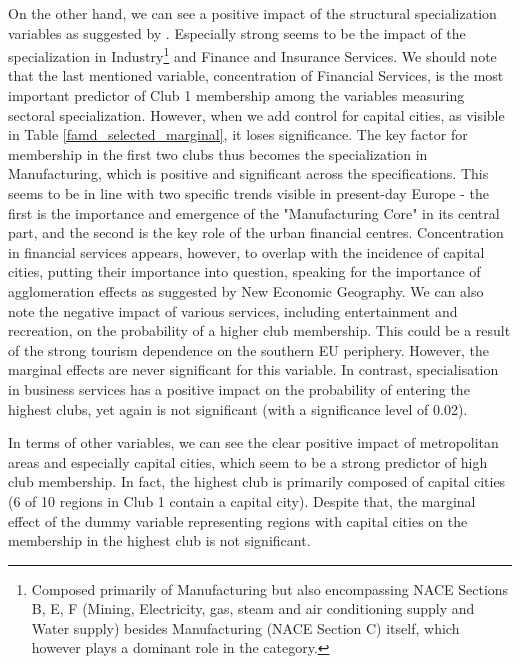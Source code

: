 \documentclass[11pt]{article}
\begin{document}
On the other hand, we can see a positive impact of the structural specialization variables as suggested by \citet{cutrini2019economic}. Especially strong seems to be the impact of the specialization in Industry\footnote{Composed primarily of Manufacturing but also encompassing NACE Sections B, E, F (Mining, Electricity, gas, steam and air conditioning supply and Water supply) besides Manufacturing (NACE Section C) itself, which however plays a dominant role in the category.} and Finance and Insurance Services. We should note that the last mentioned variable, concentration of Financial Services, is the most important predictor of Club 1 membership among the variables measuring sectoral specialization. However, when we add control for capital cities, as visible in Table \ref{famd_selected_marginal}, it loses significance. The key factor for membership in the first two clubs thus becomes the specialization in Manufacturing, which is positive and significant across the specifications. This seems to be in line with two specific trends visible in present-day Europe - the first is the importance and emergence of the "Manufacturing Core" in its central part, and the second is the key role of the urban financial centres. Concentration in financial services appears, however, to overlap with the incidence of capital cities, putting their importance into question, speaking for the importance of agglomeration effects as suggested by New Economic Geography.
We can also note the negative impact of various services, including entertainment and recreation, on the probability of a higher club membership. This could be a result of the strong tourism dependence on the southern EU periphery. However, the marginal effects are never significant for this variable. In contrast, specialisation in business services has a positive impact on the probability of entering the highest clubs, yet again is not significant (with a significance level of 0.02).

In terms of other variables, we can see the clear positive impact of metropolitan areas and especially capital cities, which seem to be a strong predictor of high club membership. In fact, the highest club is primarily composed of capital cities (6 of 10 regions in Club 1 contain a capital city). Despite that, the marginal effect of the dummy variable representing regions with capital cities on the membership in the highest club is not significant.
\end{document}
